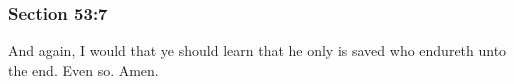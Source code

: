 	\subsubsection{Section 53:7} %
		\label{DC53-7}

		And again, I would that ye should learn that he only is saved who endureth unto the end.  Even so.  Amen.

